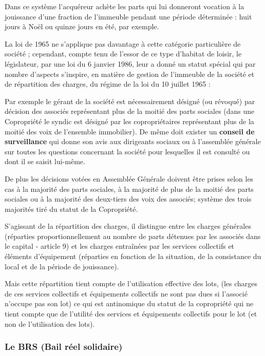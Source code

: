 			Dans ce système l'acquéreur achète les parts qui lui donneront vocation à la jouissance d'une fraction de
			l'immeuble pendant une période déterminée : huit jours à Noël ou quinze jours en été, par exemple.
			
			La loi de 1965 ne s'applique pas davantage à cette catégorie particulière de société ; cependant, compte
			tenu de l'essor de ce type d'habitat de loisir, le législateur, par une loi du 6 janvier 1986, leur a donné un
			statut spécial qui par nombre d'aspects s'inspire, en matière de gestion de l'immeuble de la société et de
			répartition des charges, du régime de la loi du 10 juillet 1965 :
			
			Par exemple le gérant de la société est nécessairement désigné (ou révoqué) par décision des associés
			représentant plus de la moitié des parts sociales (dans une Copropriété le syndic est désigné par les
			copropriétaires représentant plus de la moitié des voix de l'ensemble immobilier). De même doit exister
			un \textbf{conseil de surveillance} qui donne son avis aux dirigeants sociaux ou à l'assemblée générale sur toutes
			les questions concernant la société pour lesquelles il est consulté ou dont il se saisit lui-même.
			
			De plus les décisions votées en Assemblée Générale doivent être prises selon les cas à la majorité des parts
			sociales, à la majorité de plus de la moitié des parts sociales ou à la majorité des deux-tiers des voix des
			associés; système des trois majorités tiré du statut de la Copropriété.
			
			S'agissant de la répartition des charges, il distingue entre les charges générales (réparties
			proportionnellement au nombre de parts détenues par les associés dans le capital - article 9) et les charges
			entraînées par les services collectifs et éléments d'équipement (réparties en fonction de la situation, de
			la consistance du local et de la période de jouissance).
			
			Mais cette répartition tient compte de l'utilisation effective des lots, (les charges de ces services collectifs
			et équipements collectifs ne sont pas dues si l'associé n'occupe pas son lot) ce qui est antinomique du
			statut de la copropriété qui ne tient compte que de l'utilité des services et équipements collectifs pour le
			lot (et non de l'utilisation des lots).
		
		\subsubsection{Le BRS (Bail réel solidaire)}
		
